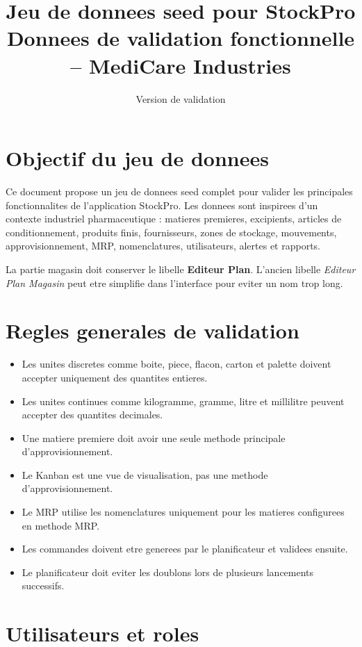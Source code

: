 \documentclass[11pt,a4paper]{article}
\title{\textbf{Jeu de donnees seed pour StockPro}\\
\large Donnees de validation fonctionnelle -- MediCare Industries}
\author{}
\date{Version de validation}
\begin{document}
\maketitle
\tableofcontents
\newpage

\section{Objectif du jeu de donnees}

Ce document propose un jeu de donnees seed complet pour valider les principales fonctionnalites de l'application StockPro. Les donnees sont inspirees d'un contexte industriel pharmaceutique : matieres premieres, excipients, articles de conditionnement, produits finis, fournisseurs, zones de stockage, mouvements, approvisionnement, MRP, nomenclatures, utilisateurs, alertes et rapports.

\begin{note}
La partie magasin doit conserver le libelle \textbf{Editeur Plan}. L'ancien libelle \textit{Editeur Plan Magasin} peut etre simplifie dans l'interface pour eviter un nom trop long.
\end{note}

\section{Regles generales de validation}

\begin{itemize}
  \item Les unites discretes comme boite, piece, flacon, carton et palette doivent accepter uniquement des quantites entieres.
  \item Les unites continues comme kilogramme, gramme, litre et millilitre peuvent accepter des quantites decimales.
  \item Une matiere premiere doit avoir une seule methode principale d'approvisionnement.
  \item Le Kanban est une vue de visualisation, pas une methode d'approvisionnement.
  \item Le MRP utilise les nomenclatures uniquement pour les matieres configurees en methode MRP.
  \item Les commandes doivent etre generees par le planificateur et validees ensuite.
  \item Le planificateur doit eviter les doublons lors de plusieurs lancements successifs.
\end{itemize}

\section{Utilisateurs et roles}
\end{document}
